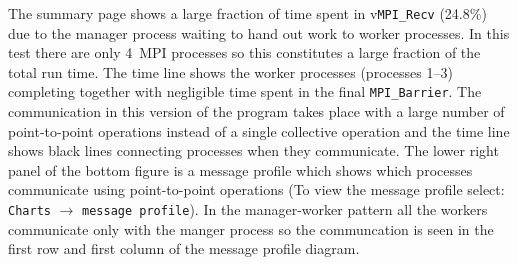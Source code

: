 \documentclass[a4paper,titlepage]{article}
\begin{document}
The summary page shows a large fraction of time spent in v\verb+MPI_Recv+ (24.8\%) due to the manager process waiting to hand out work to worker processes. In this test there are only 4~MPI processes so this constitutes a large fraction of the total run time. The time line shows the worker processes (processes 1--3) completing together with negligible time spent in the final \verb+MPI_Barrier+. The communication in this version of the program takes place with a large number of point-to-point operations instead of a single collective operation and the time line shows black lines connecting processes when they communicate. The lower right panel of the bottom figure is a message profile which shows which processes communicate using point-to-point operations (To view the message profile select: \texttt{Charts} $\rightarrow$ \texttt{message profile}). In the manager-worker pattern all the workers communicate only with the manger process so the communcation is seen in the first row and first column of the message profile diagram. \\
\end{document}
